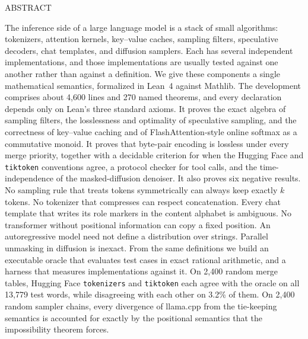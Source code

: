 \documentclass[10pt]{article}
\newcommand{\qptlabel}[1]{{\qptlabelfont\footnotesize\MakeUppercase{#1}}}
\theoremstyle{qpt}
\begin{document}
\vspace{1.4em}
\begin{tcolorbox}[enhanced, colback=Surface, colframe=Surface, colupper=Ink, boxrule=0pt,
  arc=0pt, left=12pt, right=12pt, top=9pt, bottom=10pt]
\qptlabel{Abstract}\par\vspace{0.35em}
{\small
The inference side of a large language model is a stack of small algorithms:
tokenizers, attention kernels, key--value caches, sampling filters, speculative
decoders, chat templates, and diffusion samplers. Each has several independent
implementations, and those implementations are usually tested against one another
rather than against a definition. We give these components a single mathematical
semantics, formalized in Lean~4 against Mathlib. The development comprises about
4{,}600 lines and 270 named theorems, and every declaration depends only on Lean's
three standard axioms. It proves the exact algebra of sampling filters, the
losslessness and optimality of speculative sampling, and the correctness of
key--value caching and of FlashAttention-style online softmax as a commutative
monoid. It proves that byte-pair encoding is lossless under every merge priority,
together with a decidable criterion for when the Hugging Face and \texttt{tiktoken}
conventions agree, a protocol checker for tool calls, and the time-independence of
the masked-diffusion denoiser. It also proves six negative results. No sampling
rule that treats tokens symmetrically can always keep exactly $k$ tokens. No
tokenizer that compresses can respect concatenation. Every chat template that writes
its role markers in the content alphabet is ambiguous. No transformer without
positional information can copy a fixed position. An autoregressive model need not
define a distribution over strings. Parallel unmasking in diffusion is inexact.
From the same definitions we build an executable oracle that evaluates test cases in
exact rational arithmetic, and a harness that measures implementations against it.
On 2{,}400 random merge tables, Hugging Face \texttt{tokenizers} and
\texttt{tiktoken} each agree with the oracle on all 13{,}779 test words, while
disagreeing with each other on 3.2\% of them. On 2{,}400 random sampler chains,
every divergence of llama.cpp from the tie-keeping semantics is accounted for
exactly by the positional semantics that the impossibility theorem forces.
\par}
\end{tcolorbox}
\end{document}

